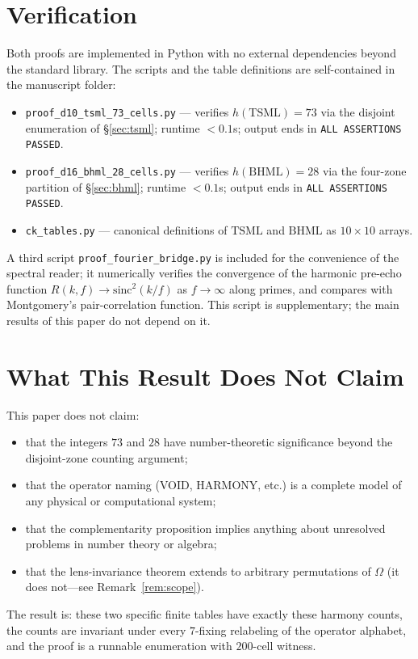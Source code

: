 \documentclass[11pt,reqno]{amsart}
\theoremstyle{plain}
\theoremstyle{definition}
\theoremstyle{remark}
\newcommand{\TSML}{\mathrm{TSML}}
\newcommand{\BHML}{\mathrm{BHML}}
\begin{document}
\section{Verification}\label{sec:verify}

Both proofs are implemented in Python with no external
dependencies beyond the standard library. The scripts and the
table definitions are self-contained in the manuscript folder:
\begin{itemize}\setlength\itemsep{2pt}
\item \texttt{proof\_d10\_tsml\_73\_cells.py} —
verifies $h(\TSML) = 73$ via the disjoint enumeration of
\S\ref{sec:tsml}; runtime $< 0.1$s; output ends in
\texttt{ALL ASSERTIONS PASSED}.
\item \texttt{proof\_d16\_bhml\_28\_cells.py} —
verifies $h(\BHML) = 28$ via the four-zone partition of
\S\ref{sec:bhml}; runtime $< 0.1$s; output ends in
\texttt{ALL ASSERTIONS PASSED}.
\item \texttt{ck\_tables.py} —
canonical definitions of $\TSML$ and $\BHML$ as $10 \times 10$
arrays.
\end{itemize}
A third script \texttt{proof\_fourier\_bridge.py} is included for
the convenience of the spectral reader; it numerically verifies
the convergence of the harmonic pre-echo function
$R(k, f) \to \mathrm{sinc}^2(k/f)$ as $f \to \infty$ along primes,
and compares with Montgomery's pair-correlation function. This
script is supplementary; the main results of this paper do not
depend on it.

\section{What This Result Does Not Claim}\label{sec:limits}

This paper does not claim:
\begin{itemize}\setlength\itemsep{1pt}
\item that the integers $73$ and $28$ have number-theoretic
significance beyond the disjoint-zone counting argument;
\item that the operator naming (VOID, HARMONY, etc.) is a complete
model of any physical or computational system;
\item that the complementarity proposition implies anything
about unresolved problems in number theory or algebra;
\item that the lens-invariance theorem extends to arbitrary
permutations of $\Omega$ (it does not---see
Remark~\ref{rem:scope}).
\end{itemize}
The result is: these two specific finite tables have exactly these
harmony counts, the counts are invariant under every
$7$-fixing relabeling of the operator alphabet, and the proof is
a runnable enumeration with $200$-cell witness.
\end{document}
